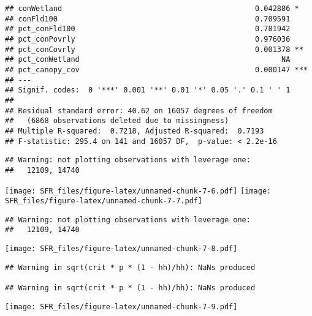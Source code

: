 \documentclass[]{article}
\begin{document}
\begin{verbatim}
## conWetland                                            0.042886 *  
## conFld100                                             0.709591    
## pct_conFld100                                         0.781942    
## pct_conPovrly                                         0.976036    
## pct_conCovrly                                         0.001378 ** 
## pct_conWetland                                              NA    
## pct_canopy_cov                                        0.000147 ***
## ---
## Signif. codes:  0 '***' 0.001 '**' 0.01 '*' 0.05 '.' 0.1 ' ' 1
## 
## Residual standard error: 40.62 on 16057 degrees of freedom
##   (6868 observations deleted due to missingness)
## Multiple R-squared:  0.7218, Adjusted R-squared:  0.7193 
## F-statistic: 295.4 on 141 and 16057 DF,  p-value: < 2.2e-16
\end{verbatim}

\begin{verbatim}
## Warning: not plotting observations with leverage one:
##   12109, 14740
\end{verbatim}

\texttt{[image: SFR\_files/figure-latex/unnamed-chunk-7-6.pdf]}
\texttt{[image: SFR\_files/figure-latex/unnamed-chunk-7-7.pdf]}

\begin{verbatim}
## Warning: not plotting observations with leverage one:
##   12109, 14740
\end{verbatim}

\texttt{[image: SFR\_files/figure-latex/unnamed-chunk-7-8.pdf]}

\begin{verbatim}
## Warning in sqrt(crit * p * (1 - hh)/hh): NaNs produced

## Warning in sqrt(crit * p * (1 - hh)/hh): NaNs produced
\end{verbatim}

\texttt{[image: SFR\_files/figure-latex/unnamed-chunk-7-9.pdf]}
\end{document}
